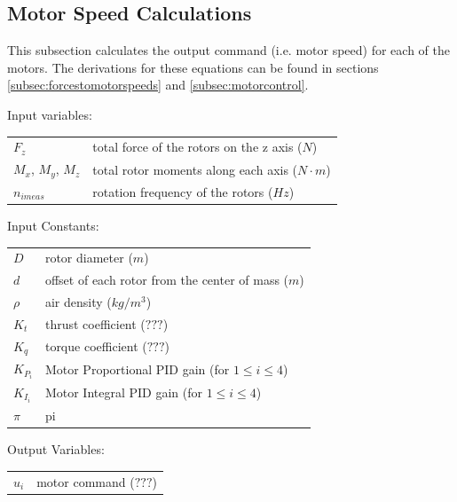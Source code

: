\documentclass{article}
\numberwithin{equation}{section} %
\begin{document}
\subsection{Motor Speed Calculations} \label{subsec:motorspeedcalculations}
This subsection calculates the output command (i.e. motor speed) for each of the motors. The derivations for these equations can be found in sections \ref{subsec:forcestomotorspeeds} and \ref{subsec:motorcontrol}.

\bigskip
Input variables:
\begin{tabular}{l l}
 	$ F_{z} $				& total force of the rotors on the z axis ($N$) \\
 	$ M_{x}$, $M_y$, $M_{z} $		& total rotor moments along each axis ($N \cdot m$) \\
 	$ n_{imeas} $					& rotation frequency of the rotors ($Hz$) \\

\end{tabular}

\bigskip
Input Constants:
\begin{tabular}{l l}
 	$ D $ 					& rotor diameter ($m$) \\
 	$ d $					& offset of each rotor from the center of mass ($m$) \\
 	$ \rho $				& air density ($kg/m^3$) \\
 	$ K_t $					& thrust coefficient ($???$) \\
 	$ K_q $					& torque coefficient ($???$) \\
 	$ K_{P_i} $				& Motor Proportional PID gain (for $1 \leq i \leq 4$) \\
 	$ K_{I_i} $				& Motor Integral PID gain (for $1 \leq i \leq 4$) \\
 	$ \pi $					& pi \\
\end{tabular}

\bigskip
Output Variables:
\begin{tabular}{l l}
 	$ u_i $					& motor command ($???$) \\
\end{tabular}

\end{document}
